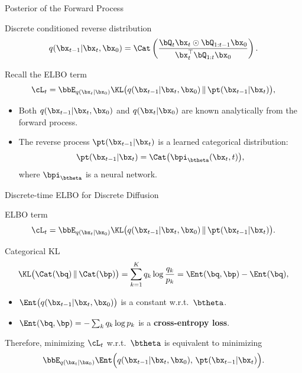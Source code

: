 \documentclass{beamer}
\begin{document}
\begin{frame}{Posterior of the Forward Process}
	\begin{block}{Discrete conditioned reverse distribution}
		\[
			q(\bx_{t-1} | \bx_t, \bx_0)
			= \Cat\left(\frac{\bQ_t \bx_t \odot \bQ_{1:t-1} \bx_0}{\bx_t^{\top}\bQ_{1:t}\bx_0}\right).
		\]
		\vspace{-0.3cm}
	\end{block}
	\eqpause
	Recall the ELBO term
	\[
		\cL_t
		= \bbE_{q(\bx_t | \bx_0)}
		\KL\bigl(q(\bx_{t-1} | \bx_t, \bx_0) \,\|\, \pt(\bx_{t-1} | \bx_t)\bigr),
	\]
	\eqpause
	\vspace{-0.5cm}
	\begin{itemize}
		\item Both $q(\bx_{t-1} | \bx_t, \bx_0)$ and $q(\bx_t | \bx_0)$ are known analytically from the forward process.
		\item The reverse process $\pt(\bx_{t-1} | \bx_t)$ is a learned categorical distribution:
		\[
			\pt(\bx_{t-1} | \bx_t) = \Cat\bigl( \bpi_{\btheta}(\bx_t, t) \bigr),
		\]
		where $\bpi_{\btheta}$ is a neural network.
	\end{itemize}
\end{frame}
\begin{frame}{Discrete-time ELBO for Discrete Diffusion}

	\begin{block}{ELBO term}
		\vspace{-0.3cm}
		\[
			\cL_t
			= \bbE_{q(\bx_t | \bx_0)}
			\KL\bigl(q(\bx_{t-1} | \bx_t, \bx_0) \,\|\, \pt(\bx_{t-1} | \bx_t)\bigr).
		\]
		\vspace{-0.3cm}
	\end{block}
	\eqpause
	\begin{block}{Categorical KL}
		\vspace{-0.3cm}
		\[
			\KL\bigl(\Cat(\bq) \,\|\, \Cat(\bp)\bigr)
			= \sum_{k=1}^K q_k \log \frac{q_k}{p_k}
			= \Ent(\bq,\bp) - \Ent(\bq),
		\]
		\eqpause
		\begin{itemize}
			\item $\Ent\bigl(q(\bx_{t-1} | \bx_t, \bx_0)\bigr)$ is a constant w.r.t.~$\btheta$.
			\item $\Ent(\bq,\bp) = -\sum_k q_k \log p_k$ is a \textbf{cross-entropy loss}.
		\end{itemize}
	\end{block}
	\eqpause
	Therefore, minimizing $\cL_t$ w.r.t.~$\btheta$ is equivalent to minimizing
	\[
		\bbE_{q(\bx_t | \bx_0)}
		\Ent\Bigl(q(\bx_{t-1} | \bx_t, \bx_0),\, \pt(\bx_{t-1} | \bx_t)\Bigr).
	\]
\end{frame}
\end{document}
